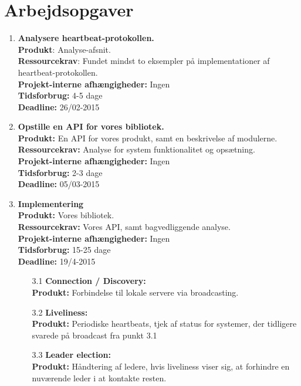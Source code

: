 \documentclass[a4paper,12pt]{article}
\begin{document}
\section*{Arbejdsopgaver}

\begin{enumerate}
\item \textbf{Analysere heartbeat-protokollen.} 
\\
\textbf{Produkt}: Analyse-afsnit. \\
\textbf{Ressourcekrav}: Fundet mindst to eksempler på implementationer af heartbeat-protokollen. \\
\textbf{Projekt-interne afhængigheder:} Ingen \\
\textbf{Tidsforbrug:} 4-5 dage \\
\textbf{Deadline:} 26/02-2015
  
\item \textbf{Opstille en API for vores bibliotek.} \\
\textbf{Produkt:} En API for vores produkt, samt en beskrivelse af modulerne. \\
\textbf{Ressourcekrav:} Analyse for system funktionalitet og opsætning. \\
\textbf{Projekt-interne afhængigheder:} Ingen \\
\textbf{Tidsforbrug:} 2-3 dage \\
\textbf{Deadline:} 05/03-2015

\item \textbf{Implementering} \\
\textbf{Produkt:} Vores bibliotek. \\
\textbf{Ressourcekrav:} Vores API, samt bagvedliggende analyse. \\
\textbf{Projekt-interne afhængigheder:} Ingen \\
\textbf{Tidsforbrug:} 15-25 dage \\
\textbf{Deadline:} 19/4-2015

\begin{enumerate}
\item[3.1] \textbf{Connection / Discovery:} \\
\textbf{Produkt:} Forbindelse til lokale servere via broadcasting.

\item[3.2] \textbf{Liveliness:} \\
\textbf{Produkt:} Periodiske heartbeats, tjek af status for systemer, der tidligere svarede på broadcast fra punkt 3.1

\item[3.3] \textbf{Leader election:} \\
\textbf{Produkt:} Håndtering af ledere, hvis liveliness viser sig, at forhindre en nuværende leder i at kontakte resten.


\end{enumerate}
\end{enumerate}
\end{document}
